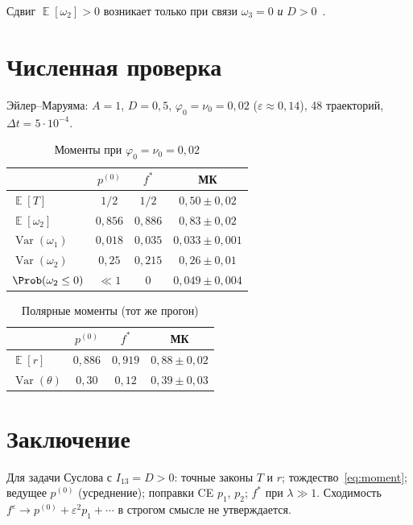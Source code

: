 \documentclass[12pt,a4paper]{article}
\DeclareMathOperator{\E}{\mathbb{E}}
\DeclareMathOperator{\Var}{Var}
\newcommand{\phiz}{\varphi_0}
\newcommand{\nuz}{\nu_0}
\begin{document}
Сдвиг $\E[\omega_2]>0$ возникает только при связи $\omega_3=0$ \emph{и} $D>0$~\cite{MatSin1996}.

\section{Численная проверка}

Эйлер--Маруяма: $A=1$, $D=0{,}5$, $\phiz=\nuz=0{,}02$ ($\varepsilon\approx0{,}14$),
48 траекторий, $\Delta t=5\cdot10^{-4}$.

\begin{table}[h]
\centering
\caption{Моменты при $\phiz=\nuz=0{,}02$}
\begin{tabular}{lccc}
\toprule
 & $p^{(0)}$ & $f^*$ & МК \\
\midrule
$\E[T]$ & $1/2$ & $1/2$ & $0{,}50\pm0{,}02$ \\
$\E[\omega_2]$ & $0{,}856$ & $0{,}886$ & $0{,}83\pm0{,}02$ \\
$\Var(\omega_1)$ & $0{,}018$ & $0{,}035$ & $0{,}033\pm0{,}001$ \\
$\Var(\omega_2)$ & $0{,}25$ & $0{,}215$ & $0{,}26\pm0{,}01$ \\
$\Prob(\omega_2\le0)$ & $\ll1$ & $0$ & $0{,}049\pm0{,}004$ \\
\bottomrule
\end{tabular}
\end{table}

\begin{table}[h]
\centering
\caption{Полярные моменты (тот же прогон)}
\begin{tabular}{lccc}
\toprule
 & $p^{(0)}$ & $f^*$ & МК \\
\midrule
$\E[r]$ & $0{,}886$ & $0{,}919$ & $0{,}88\pm0{,}02$ \\
$\Var(\theta)$ & $0{,}30$ & $0{,}12$ & $0{,}39\pm0{,}03$ \\
\bottomrule
\end{tabular}
\end{table}

\section{Заключение}

Для задачи Суслова с $I_{13}=D>0$: точные законы $T$ и $r$; тождество~\eqref{eq:moment};
ведущее $p^{(0)}$ (усреднение); поправки CE $p_1$, $p_2$; $f^*$ при $\lambda\gg1$.
Сходимость $f^\varepsilon\to p^{(0)}+\varepsilon^2 p_1+\cdots$ в строгом смысле не утверждается.

\appendix
\end{document}
